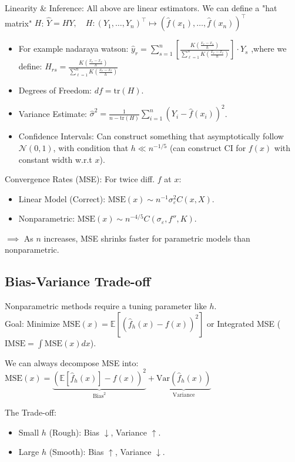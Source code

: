 Linearity \& Inference:
All above are linear estimators. We can define a "hat matrix" $H$:
 $\hat{Y} = H Y, \quad H: (Y_1, \dots, Y_n)^\top \mapsto (\hat{f}(x_1), \dots, \hat{f}(x_n))^\top$
 
\begin{itemize}
    \item For example nadaraya watson: $\hat{y}_r = \sum_{s=1}^{n} \left[ \frac{K \left( \frac{x_r - x_s}{h} \right)}{\sum_{\ell=1}^{n} K \left( \frac{x_r - x_\ell}{h} \right)} \right] \cdot Y_s$ ,where we define: $H_{rs} = \frac{K \left( \frac{x_r - x_s}{h} \right)}{\sum_{\ell=1}^{n} K \left( \frac{x_r - x_\ell}{h} \right)}$
    \item Degrees of Freedom: $df = \text{tr}(H)$.
    \item Variance Estimate: $\hat{\sigma}^2 = \frac{1}{n - \text{tr}(H)} \sum_{i=1}^n (Y_i - \hat{f}(x_i))^2$.
    \item Confidence Intervals: Can construct something that asymptotically follow $\mathcal{N}(0,1)$, with condition that $h \ll n^{-1/5}$ (can construct CI for $f(x)$ with constant width w.r.t $x$).
\end{itemize}

Convergence Rates (MSE):
For twice diff. $f$ at $x$:
\begin{itemize}
    \item Linear Model (Correct): $\text{MSE}(x) \sim n^{-1} \sigma_\varepsilon^2 C(x, X)$.
    \item Nonparametric: $\text{MSE}(x) \sim n^{-4/5} C(\sigma_\varepsilon, f'', K)$.
\end{itemize}
$\implies$ As $n$ increases, MSE shrinks faster for parametric models than nonparametric.

\subsection{Bias-Variance Trade-off}
Nonparametric methods require a tuning parameter like $h$.
\\ Goal: Minimize $\text{MSE}(x) = \mathbb{E}[(\hat{f}_h(x) - f(x))^2]$ or Integrated MSE ($\text{IMSE} = \int \text{MSE}(x) dx$).

We can always decompose MSE into: $\text{MSE}(x) = \underbrace{(\mathbb{E}[\hat{f}_h(x)] - f(x))^2}_{\text{Bias}^2} + \underbrace{\text{Var}(\hat{f}_h(x))}_{\text{Variance}} $

The Trade-off:
\begin{itemize}
    \item Small $h$ (Rough): Bias $\downarrow$, Variance $\uparrow$.
    \item Large $h$ (Smooth): Bias $\uparrow$, Variance $\downarrow$.
\end{itemize}

